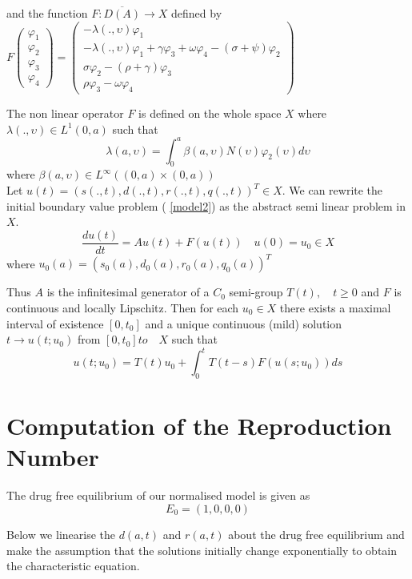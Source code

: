 and the function $F :\overline{D(A)}\longrightarrow X $ defined by $F \begin{pmatrix}
\varphi_{1} \\ \varphi_{2} \\ \varphi_{3} \\ \varphi_{4}
\end{pmatrix}=\begin{pmatrix}
- \lambda (., \upsilon) \varphi_{1}\\ -\lambda(., \upsilon)\varphi_{1} + \gamma \varphi_{3} + \omega \varphi_{4}-(\sigma + \psi)\varphi_{2} \\ \sigma \varphi_{2}-(\rho + \gamma)\varphi_{3} \\ \rho \varphi_{3}-\omega \varphi_{4} \end{pmatrix} $

The non linear operator $F$ is defined on the whole space $X$ where $\lambda (.,\upsilon) \in L^{1} (0,a)$ such that
$$\lambda (a,\upsilon)= \int_{0}^{a} \beta (a, \upsilon) N(\upsilon) \varphi_{2}(\upsilon) d \upsilon$$  where
$\beta (a, \upsilon) \in L^{\infty}( (0,a) \times (0,a)) $\\

Let $u(t) = (s(.,t),d(.,t),r(.,t),q(.,t))^T \in X$. We can rewrite the initial boundary value problem ( \ref{model2}) as the abstract semi linear problem in $X$.
\begin{equation}
\frac{d u(t)}{dt} =A u(t) + F(u (t)) \quad u(0)= u_0 \in X
\end{equation}
where $u_{0}(a)=(s_{0}(a), d_{0}(a) , r_{0}(a) , q_{0}(a))^T$

Thus $A$ is the infinitesimal generator of a $C_0$ semi-group $T(t) , \quad t\geq 0$ and $F$ is continuous and locally Lipschitz. Then for each $u_0 \in X$ there exists a maximal interval of existence $[0, t_0]$ and a unique continuous (mild) solution $t\longrightarrow u(t;u_0)$ from $[0,t_0]  to \quad X$ such that 
\begin{equation}
u(t;u_0) = T(t)u_0 + \int_{0}^{t}T(t-s)F(u(s;u_0))ds
\end{equation}
\section{Computation of the Reproduction Number}

The drug free equilibrium of our normalised model is given as \[E_0 = (1,0,0,0)\]

Below we linearise the $d(a,t)$  and $r(a,t)$ about the drug free equilibrium and make the assumption that the solutions initially change exponentially to obtain the characteristic equation. 

